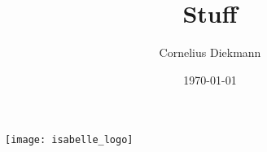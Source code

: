 \documentclass[a4paper,landscape,Screen16to9]{foils}
\newcommand{\titlestyle}{\color{DarkGreen}}
\begin{document}
\title{\titlestyle Stuff}
\author{Cornelius Diekmann}
\date{\today{}}
\maketitle

\vfill
\begin{center}
  \texttt{[image: isabelle\_logo]}
\end{center}


\end{document}
